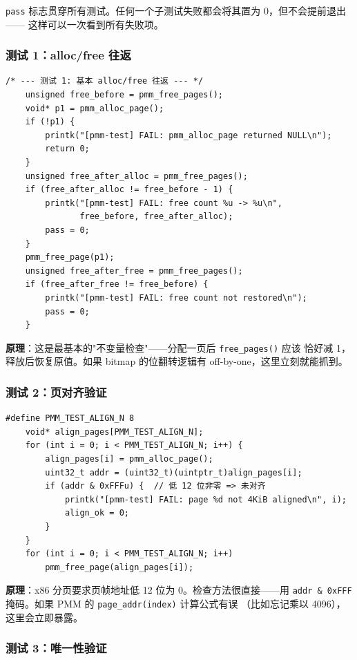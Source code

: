 \texttt{pass} 标志贯穿所有测试。任何一个子测试失败都会将其置为 0，但不会提前退出——
这样可以一次看到所有失败项。

\subsubsection{测试 1：alloc/free 往返}

\begin{lstlisting}[style=cstyle]
    /* --- 测试 1: 基本 alloc/free 往返 --- */
    unsigned free_before = pmm_free_pages();
    void* p1 = pmm_alloc_page();
    if (!p1) {
        printk("[pmm-test] FAIL: pmm_alloc_page returned NULL\n");
        return 0;
    }
    unsigned free_after_alloc = pmm_free_pages();
    if (free_after_alloc != free_before - 1) {
        printk("[pmm-test] FAIL: free count %u -> %u\n",
               free_before, free_after_alloc);
        pass = 0;
    }
    pmm_free_page(p1);
    unsigned free_after_free = pmm_free_pages();
    if (free_after_free != free_before) {
        printk("[pmm-test] FAIL: free count not restored\n");
        pass = 0;
    }
\end{lstlisting}

\textbf{原理}：这是最基本的"不变量检查"——分配一页后 \texttt{free\_pages()} 应该
恰好减 1，释放后恢复原值。如果 bitmap 的位翻转逻辑有 off-by-one，这里立刻就能抓到。

\subsubsection{测试 2：页对齐验证}

\begin{lstlisting}[style=cstyle]
    #define PMM_TEST_ALIGN_N 8
    void* align_pages[PMM_TEST_ALIGN_N];
    for (int i = 0; i < PMM_TEST_ALIGN_N; i++) {
        align_pages[i] = pmm_alloc_page();
        uint32_t addr = (uint32_t)(uintptr_t)align_pages[i];
        if (addr & 0xFFFu) {  // 低 12 位非零 => 未对齐
            printk("[pmm-test] FAIL: page %d not 4KiB aligned\n", i);
            align_ok = 0;
        }
    }
    for (int i = 0; i < PMM_TEST_ALIGN_N; i++)
        pmm_free_page(align_pages[i]);
\end{lstlisting}

\textbf{原理}：x86 分页要求页帧地址低 12 位为 0。检查方法很直接——用
\texttt{addr \& 0xFFF} 掩码。如果 PMM 的 \texttt{page\_addr(index)} 计算公式有误
（比如忘记乘以 4096），这里会立即暴露。

\subsubsection{测试 3：唯一性验证}


